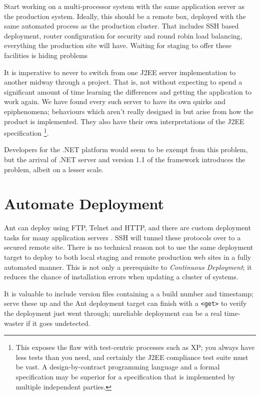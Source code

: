 \documentclass[draft]{report}
\begin{document}
Start working on a multi-processor system with the same application
server as the production system. Ideally, this should be a remote box,
deployed with the same automated process as the production cluster. That
includes SSH based deployment, router configuration for security and
round robin load balancing, everything the production site will have.
Waiting for staging to offer these facilities is hiding problems

It is imperative to never to switch from one J2EE server implementation
to another midway through a project. That is, not without expecting to
spend a significant amount of time learning the differences and getting
the application to work again. We have found every such server to have
its own quirks and epiphenomena; behaviours which aren't really designed
in but arise from how the product is implemented. They also have their
own interpretations of the J2EE specification \footnote{This exposes the
flaw with test-centric processes such as XP; you always have less tests
than you need, and certainly the J2EE compliance test suite must be
vast. A design-by-contract programming language and a formal
specification may be superior for a specification that is implemented by
multiple independent parties. }.

Developers for the .\/NET platform would seem to be exempt from this
problem, but the arrival of .\/NET server and version 1.1 of the
framework introduces the problem, albeit on a lesser scale.

\section{Automate Deployment}

Ant can deploy using FTP, Telnet and HTTP, and there are custom
deployment tasks for many application servers \cite{jakarta:ant1.5}. SSH
will tunnel these protocols over to a secured remote site. There is no
technical reason not to use the same deployment target to deploy to both
local staging and remote production web sites in a fully automated
manner. This is not only a prerequisite to \emph{Continuous Deployment};
it reduces the chance of installation errors when updating a cluster of
systems.

It is valuable to include version files containing a a build number and
timestamp; serve these up and the Ant deployment target can finish with
a \verb|<get>| to verify the deployment just went through; unreliable
deployment can be a real time-waster if it goes undetected.
\end{document}
